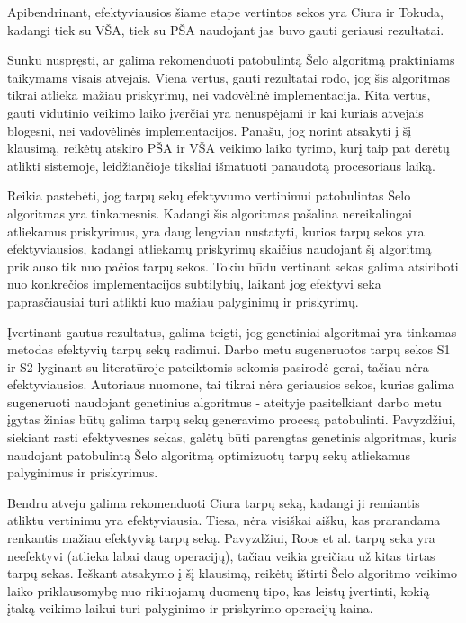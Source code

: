 \documentclass{VUMIFInfKursinis}
\begin{document}
Apibendrinant, efektyviausios šiame etape vertintos sekos yra Ciura ir Tokuda, kadangi tiek su VŠA, tiek su PŠA 
naudojant jas buvo gauti geriausi rezultatai.


Sunku nuspręsti, ar galima rekomenduoti patobulintą Šelo algoritmą praktiniams taikymams visais atvejais. 
Viena vertus, gauti rezultatai rodo, jog šis algoritmas tikrai atlieka mažiau priskyrimų, nei vadovėlinė implementacija.
Kita vertus, gauti vidutinio veikimo laiko įverčiai yra nenuspėjami ir kai kuriais atvejais blogesni, nei vadovėlinės implementacijos.
Panašu, jog norint atsakyti į šį klausimą, reikėtų atskiro PŠA ir VŠA veikimo laiko tyrimo, kurį taip pat derėtų atlikti sistemoje, leidžiančioje tiksliai išmatuoti
panaudotą procesoriaus laiką.

Reikia pastebėti, jog tarpų sekų efektyvumo vertinimui patobulintas Šelo algoritmas yra tinkamesnis.
Kadangi šis algoritmas pašalina nereikalingai atliekamus priskyrimus, yra daug lengviau nustatyti, kurios tarpų sekos yra efektyviausios,
kadangi atliekamų priskyrimų skaičius naudojant šį algoritmą priklauso tik nuo pačios tarpų sekos.
Tokiu būdu vertinant sekas galima atsiriboti nuo konkrečios implementacijos subtilybių, laikant jog efektyvi seka paprasčiausiai turi atlikti kuo mažiau palyginimų ir priskyrimų.

Įvertinant gautus rezultatus, galima teigti, jog genetiniai algoritmai yra tinkamas metodas efektyvių tarpų sekų radimui.
Darbo metu sugeneruotos tarpų sekos S1 ir S2 lyginant su literatūroje pateiktomis sekomis pasirodė gerai, tačiau nėra efektyviausios.
Autoriaus nuomone, tai tikrai nėra geriausios sekos, kurias galima sugeneruoti naudojant genetinius algoritmus - ateityje
pasitelkiant darbo metu įgytas žinias būtų galima tarpų sekų generavimo procesą patobulinti.
Pavyzdžiui, siekiant rasti efektyvesnes sekas, galėtų būti parengtas genetinis algoritmas, kuris naudojant patobulintą Šelo algoritmą
optimizuotų tarpų sekų atliekamus palyginimus ir priskyrimus.

Bendru atveju galima rekomenduoti Ciura tarpų seką, kadangi ji remiantis atliktu vertinimu yra efektyviausia.
Tiesa, nėra visiškai aišku, kas prarandama renkantis mažiau efektyvią tarpų seką.
Pavyzdžiui, Roos et al. tarpų seka yra neefektyvi (atlieka labai daug operacijų), tačiau veikia greičiau už kitas tirtas tarpų sekas.
Ieškant atsakymo į šį klausimą, reikėtų ištirti Šelo algoritmo veikimo laiko priklausomybę nuo rikiuojamų duomenų tipo,
kas leistų įvertinti, kokią įtaką veikimo laikui turi palyginimo ir priskyrimo operacijų kaina.
\end{document}

